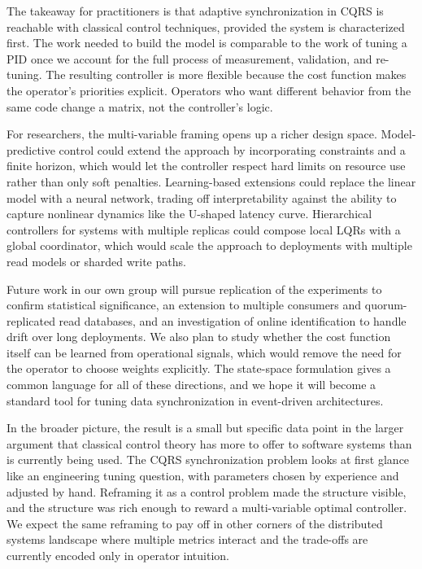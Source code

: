 \documentclass[10pt,a4paper]{article}
\begin{document}
The takeaway for practitioners is that adaptive synchronization in CQRS is reachable with classical control techniques, provided the system is characterized first. The work needed to build the model is comparable to the work of tuning a PID once we account for the full process of measurement, validation, and re-tuning. The resulting controller is more flexible because the cost function makes the operator's priorities explicit. Operators who want different behavior from the same code change a matrix, not the controller's logic.

For researchers, the multi-variable framing opens up a richer design space. Model-predictive control could extend the approach by incorporating constraints and a finite horizon, which would let the controller respect hard limits on resource use rather than only soft penalties. Learning-based extensions could replace the linear model with a neural network, trading off interpretability against the ability to capture nonlinear dynamics like the U-shaped latency curve. Hierarchical controllers for systems with multiple replicas could compose local LQRs with a global coordinator, which would scale the approach to deployments with multiple read models or sharded write paths.

Future work in our own group will pursue replication of the experiments to confirm statistical significance, an extension to multiple consumers and quorum-replicated read databases, and an investigation of online identification to handle drift over long deployments. We also plan to study whether the cost function itself can be learned from operational signals, which would remove the need for the operator to choose weights explicitly. The state-space formulation gives a common language for all of these directions, and we hope it will become a standard tool for tuning data synchronization in event-driven architectures.

In the broader picture, the result is a small but specific data point in the larger argument that classical control theory has more to offer to software systems than is currently being used. The CQRS synchronization problem looks at first glance like an engineering tuning question, with parameters chosen by experience and adjusted by hand. Reframing it as a control problem made the structure visible, and the structure was rich enough to reward a multi-variable optimal controller. We expect the same reframing to pay off in other corners of the distributed systems landscape where multiple metrics interact and the trade-offs are currently encoded only in operator intuition.
\end{document}
